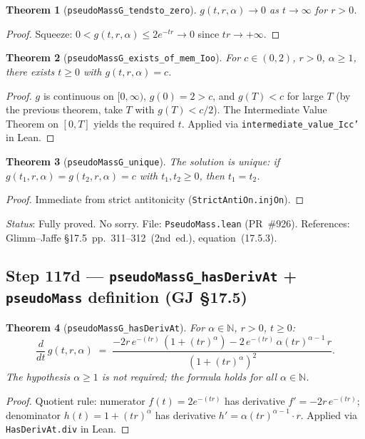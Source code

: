 \documentclass[a4paper,11pt]{article}
\newtheorem{theorem}{Theorem}
\begin{document}
\begin{theorem}[\texttt{pseudoMassG\_tendsto\_zero}]
$g(t,r,\alpha) \to 0$ as $t \to \infty$ for $r > 0$.
\end{theorem}
\begin{proof}
Squeeze: $0 < g(t,r,\alpha) \le 2e^{-tr} \to 0$ since $tr \to +\infty$.
\end{proof}

\begin{theorem}[\texttt{pseudoMassG\_exists\_of\_mem\_Ioo}]
For $c \in (0,2)$, $r > 0$, $\alpha \ge 1$, there exists $t \ge 0$ with $g(t,r,\alpha) = c$.
\end{theorem}
\begin{proof}
$g$ is continuous on $[0,\infty)$, $g(0)=2 > c$, and $g(T) < c$ for large $T$
(by the previous theorem, take $T$ with $g(T) < c/2$).
The Intermediate Value Theorem on $[0,T]$ yields the required $t$.
Applied via \texttt{intermediate\_value\_Icc'} in Lean.
\end{proof}

\begin{theorem}[\texttt{pseudoMassG\_unique}]
The solution is unique: if $g(t_1,r,\alpha) = g(t_2,r,\alpha) = c$ with $t_1, t_2 \ge 0$,
then $t_1 = t_2$.
\end{theorem}
\begin{proof}
Immediate from strict antitonicity (\texttt{StrictAntiOn.injOn}).
\end{proof}

\noindent\textit{Status}: Fully proved. No sorry.
File: \texttt{PseudoMass.lean} (PR~\#926).
References: Glimm--Jaffe \S17.5~pp.~311--312~(2nd~ed.), equation~(17.5.3).

\subsection*{Step 117d — \texttt{pseudoMassG\_hasDerivAt} + \texttt{pseudoMass} definition (GJ \S17.5)}

\begin{theorem}[\texttt{pseudoMassG\_hasDerivAt}]
For $\alpha \in \mathbb{N}$, $r > 0$, $t \ge 0$:
\[
  \frac{d}{dt}\,g(t,r,\alpha) \;=\;
  \frac{-2r\,e^{-(tr)}\,(1+(tr)^\alpha) - 2\,e^{-(tr)}\,\alpha(tr)^{\alpha-1}\,r}
       {(1+(tr)^\alpha)^2}.
\]
The hypothesis $\alpha \ge 1$ is \emph{not} required; the formula holds for all $\alpha \in \mathbb{N}$.
\end{theorem}
\begin{proof}
Quotient rule: numerator $f(t) = 2e^{-(tr)}$ has derivative $f'=-2r\,e^{-(tr)}$;
denominator $h(t) = 1+(tr)^\alpha$ has derivative $h'=\alpha(tr)^{\alpha-1}\cdot r$.
Applied via \texttt{HasDerivAt.div} in Lean.
\end{proof}
\end{document}
